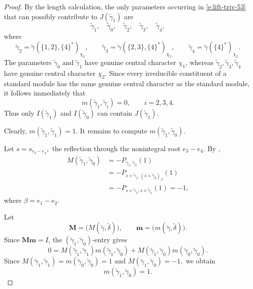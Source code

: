 \documentclass{amsart}
\theoremstyle{definition}
\begin{document}
\begin{proof}
By the length calculation, the only parameters occurring in
\eqref{e:lift-triv-53} that can possibly contribute to
\(J(\widetilde\gamma_1)\) are
\[
\widetilde\gamma_1,\quad
\widetilde\gamma_0,\quad
\widetilde\gamma_2,\quad
\widetilde\gamma_3,\quad
\widetilde\gamma_4,
\]
where
\[
\widetilde\gamma_2
=
\widetilde\gamma(\{1,2\},\{4\}^*)_{\chi_2},
\qquad
\widetilde\gamma_3
=
\widetilde\gamma(\{2,3\},\{4\}^*)_{\chi_2},
\qquad
\widetilde\gamma_4
=
\widetilde\gamma(\{4\}^*)_{\chi_2}.
\]
The parameters
\(\widetilde\gamma_0\) and \(\widetilde\gamma_1\) have genuine
central character \(\chi_1\), whereas
\(\widetilde\gamma_2,\widetilde\gamma_3,\widetilde\gamma_4\)
have genuine central character \(\chi_2\).
Since every irreducible constituent of a standard module has the
same genuine central character as the standard module, it follows
immediately that
\[
m(\widetilde\gamma_1,\widetilde\gamma_i)=0,
\qquad i=2,3,4.
\]
Thus only
\(I(\widetilde\gamma_1)\) and \(I(\widetilde\gamma_0)\)
can contain \(J(\widetilde\gamma_1)\).

Clearly,
$m(\widetilde\gamma_1,\widetilde\gamma_1)=1.$
It remains to compute
\(m(\widetilde\gamma_1,\widetilde\gamma_0)\).

Let $s=s_{e_3-e_4},$
the reflection through the nonintegral root \(e_3-e_4\).
By \cite[Proposition 7.10, Case II (iv)]{RT00},
\[
\begin{aligned}
M(\widetilde\gamma_1,\widetilde\gamma_0)
&=
-P_{\widetilde\gamma_1,\widetilde\gamma_0}(1)\\
&=
-P_{s\times\widetilde\gamma_1,
   (s\times\widetilde\gamma_0)_\beta}(1)\\
&=
-P_{s\times\widetilde\gamma_1,
   s\times\widetilde\gamma_1}(1)
=-1,
\end{aligned}
\]
where \(\beta=e_1-e_2\).

Let
\[
\mathbf M
=
\bigl(M(\widetilde\gamma,\widetilde\delta)\bigr),
\qquad
\mathbf m
=
\bigl(m(\widetilde\gamma,\widetilde\delta)\bigr).
\]
Since \(\mathbf M\mathbf m=I\), the
\((\widetilde\gamma_1,\widetilde\gamma_0)\)-entry gives
\[
0
=
M(\widetilde\gamma_1,\widetilde\gamma_1)
m(\widetilde\gamma_1,\widetilde\gamma_0)
+
M(\widetilde\gamma_1,\widetilde\gamma_0)
m(\widetilde\gamma_0,\widetilde\gamma_0).
\]
Since
$M(\widetilde\gamma_1,\widetilde\gamma_1)
=
m(\widetilde\gamma_0,\widetilde\gamma_0)
=1$
and
$M(\widetilde\gamma_1,\widetilde\gamma_0)=-1,$
we obtain
\[
m(\widetilde\gamma_1,\widetilde\gamma_0)=1.
\]
\end{proof}
\end{document}

